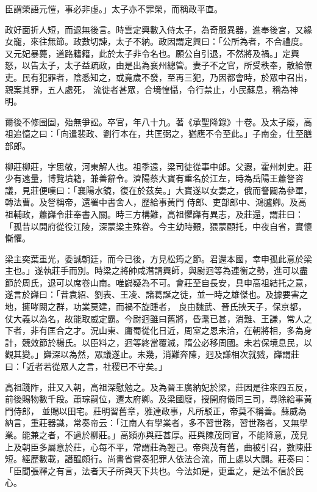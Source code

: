 \begin{pinyinscope}
 臣謂榮語元愷，事必非虛。」太子亦不罪榮，而稱政平直。



 政好面折人短，而退無後言。時雲定興數入侍太子，為奇服異器，進奉後宮，又緣女寵，來往無節。政數切諫，太子不納。政因謂定興曰：「公所為者，不合禮度。又元妃暴薨，道路籍籍，此於太子非令名也。願公自引退，不然將及禍。」定興怒，以告太子，太子益疏政，由是出為襄州總管。妻子不之官，所受秩奉，散給僚吏。民有犯罪者，陰悉知之，或竟歲不發，至再三犯，乃因都會時，於眾中召出，親案其罪，五人處死，
 流徙者甚眾，合境惶懾，令行禁止，小民蘇息，稱為神明。



 爾後不修囹圄，殆無爭訟。卒官，年八十九。著《承聖降錄》十卷。及太子廢，高祖追憶之曰：「向遣裴政、劉行本在，共匡弼之，猶應不令至此。」子南金，仕至膳部郎。



 柳莊柳莊，字思敬，河東解人也。祖季遠，梁司徒從事中郎。父遐，霍州刺史。莊少有遠量，博覽墳籍，兼善辭令。濟陽蔡大寶有重名於江左，時為岳陽王蕭詧咨議，見莊便嘆曰：「襄陽水鏡，復在於茲矣。」大寶遂以女妻之，俄而詧闢為參軍，轉法曹。及詧稱帝，還署中書舍人，歷給事黃門
 侍郎、吏部郎中、鴻臚卿。及高祖輔政，蕭巋令莊奉書入關。時三方構難，高祖懼巋有異志，及莊還，謂莊曰：「孤昔以開府從役江陵，深蒙梁主殊眷。今主幼時艱，猥蒙顧托，中夜自省，實懷慚懼。



 梁主奕葉重光，委誠朝廷，而今已後，方見松筠之節。君還本國，幸申孤此意於梁主也。」遂執莊手而別。時梁之將帥咸潛請興師，與尉迥等為連衡之勢，進可以盡節於周氏，退可以席卷山南。唯巋疑為不可。會莊至自長安，具申高祖結托之意，遂言於巋曰：「昔袁紹、劉表、王凌、諸葛誕之徒，並一時之雄傑也。及據要害之地，擁哮闞之群，功業莫建，而禍不旋踵者，
 良由魏武、晉氏挾天子，保京都，仗大義以為名，故能取威定霸。今尉迥雖曰舊將，昏耄已甚，消難、王謙，常人之下者，非有匡合之才。況山東、庸蜀從化日近，周室之恩未洽，在朝將相，多為身計，競效節於楊氏。以臣料之，迥等終當覆滅，隋公必移周國。未若保境息民，以觀其變。」巋深以為然，眾議遂止。未幾，消難奔陳，迥及謙相次就戮，巋謂莊曰：「近者若從眾人之言，社稷已不守矣。」



 高祖踐阼，莊又入朝，高祖深慰勉之。及為晉王廣納妃於梁，莊因是往來四五反，前後賜物數千段。蕭琮嗣位，遷太府卿。及梁國廢，授開府儀同三司，尋除給事黃門侍郎，
 並賜以田宅。莊明習舊章，雅達政事，凡所駁正，帝莫不稱善。蘇威為納言，重莊器識，常奏帝云：「江南人有學業者，多不習世務，習世務者，又無學業。能兼之者，不過於柳莊。」高熲亦與莊甚厚。莊與陳茂同官，不能降意，茂見上及朝臣多屬意於莊，心每不平，常謂莊為輕己。帝與茂有舊，曲被引召，數陳莊短。經歷數載，譖醖頗行。尚書省嘗奏犯罪人依法合流，而上處以大闢。莊奏曰：「臣聞張釋之有言，法者天子所與天下共也。今法如是，更重之，是法不信於民心。




\end{pinyinscope}
